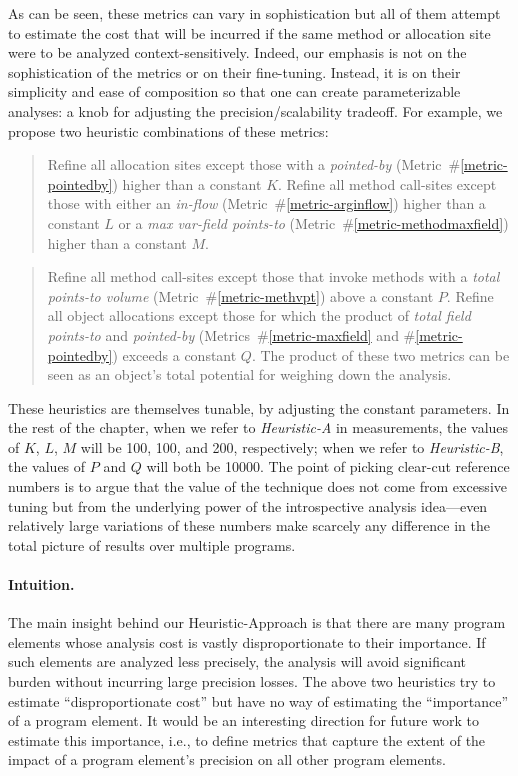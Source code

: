 As can be seen, these metrics can vary in sophistication but all of them attempt to estimate the cost that will be incurred if the same method or allocation site were to be analyzed context-sensitively. Indeed, our emphasis is not on the sophistication of the metrics or on their fine-tuning. Instead, it is on their simplicity and ease of composition so that one can create parameterizable analyses: a knob for adjusting the precision/scalability tradeoff. For example, we propose two heuristic combinations of these metrics:

\begin{quote}
Refine all allocation sites except those with a \emph{pointed-by} (Metric~\#\ref{metric-pointedby}) higher than a constant $K$.  Refine all method call-sites except those with either an \emph{in-flow} (Metric~\#\ref{metric-arginflow}) higher than a constant $L$ or a \emph{max var-field points-to} (Metric~\#\ref{metric-methodmaxfield}) higher than a constant $M$.
\end{quote}

\begin{quote}
Refine all method call-sites except those that invoke methods with a \emph{total points-to volume} (Metric~\#\ref{metric-methvpt}) above a constant $P$. Refine all object allocations except those for which the product of \emph{total field points-to} and \emph{pointed-by} (Metrics~\#\ref{metric-maxfield} and \#\ref{metric-pointedby}) exceeds a constant $Q$. The product of these two metrics can be seen as an object's total potential for weighing down the analysis.
\end{quote}

These heuristics are themselves tunable, by adjusting the constant parameters. In the rest of the chapter, when we refer to \emph{Heuristic-A} in measurements, the values of $K$, $L$, $M$ will be 100, 100, and 200, respectively; when we refer to \emph{Heuristic-B}, the values of $P$ and $Q$ will both be 10000. The point of picking clear-cut reference numbers is to argue that the value of the technique does not come from excessive tuning but from the underlying power of the introspective analysis idea---even relatively large variations of these numbers make scarcely any difference in the total picture of results over multiple programs.

\paragraph*{Intuition.} 
The main insight behind our Heuristic-Approach is that there are many program elements whose analysis cost is vastly disproportionate to their importance. If such elements are analyzed less precisely, the analysis will avoid significant burden without incurring large precision losses. The above two heuristics try to estimate ``disproportionate cost'' but have no way of estimating the ``importance'' of a program element. It would be an interesting direction for future work to estimate this importance, i.e., to define metrics that capture the extent of the impact of a program element's precision on all other program elements.


